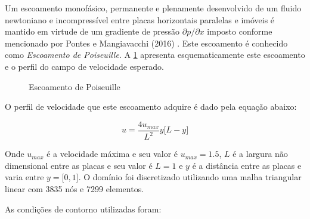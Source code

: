 Um escoamento monofásico, permanente e plenamente desenvolvido
de um fluido newtoniano e incompressível 
entre placas horizontais paralelas e imóveis é 
mantido em virtude de um gradiente de pressão 
$\partial p/\partial x$ imposto conforme mencionado por Pontes e Mangiavacchi (2016) \cite{pontes2016}.
Este escoamento é conhecido como \textit{Escoamento de Poiseuille}.
A \ref{poiseuille} apresenta esquematicamente este escoamento e
o perfil do campo de velocidade esperado.

\begin{figure}[H]
\begin{center}
\end{center}
\caption{Escoamento de Poiseuille}
\label{poiseuille}
\end{figure}

\noindent
O perfil de velocidade que este escoamento adquire 
é dado pela equação abaixo:

\begin{equation}
 u = \frac{4 u_{max}}{L^2} y \big[ L - y \big]
\end{equation}

\medskip
\noindent
Onde $u_{max}$ é a velocidade máxima e seu valor é
$u_{max} = 1.5$, $L$ é a largura não dimensional
entre as placas e seu valor é $L = 1$
e $y$ é a distância entre as placas e varia entre $y = \big[ 0,1 \big]$.
O domínio foi discretizado utilizando uma malha 
triangular linear com 3835 nós e 7299 elementos. 

\medskip
\noindent
As condições de contorno utilizadas foram:


